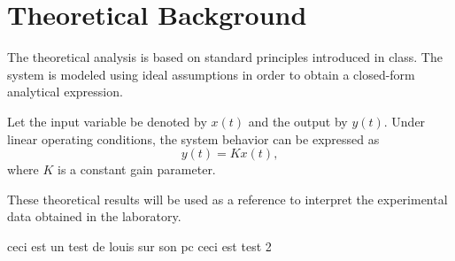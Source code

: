 \section{Theoretical Background}
\label{sec:theory}

The theoretical analysis is based on standard principles introduced in class.
The system is modeled using ideal assumptions in order to obtain a closed-form
analytical expression.

Let the input variable be denoted by $x(t)$ and the output by $y(t)$. Under linear
operating conditions, the system behavior can be expressed as
\[
y(t) = K x(t),
\]
where $K$ is a constant gain parameter.

These theoretical results will be used as a reference to interpret the experimental
data obtained in the laboratory.

ceci est un test de louis sur son pc
ceci est test 2